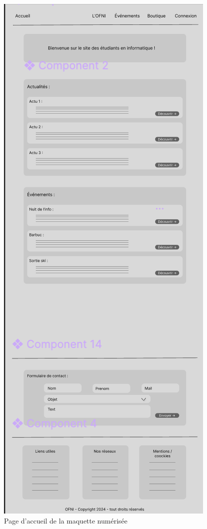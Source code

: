 \begin{figure}[H]
    \centering
    \includegraphics[scale=0.4]{assets/pictures/figma.png}
    \caption{Page d'accueil de la maquette numérisée}
    \label{fig:enter-label}
\end{figure}

